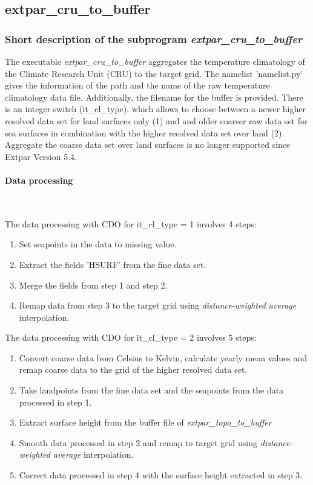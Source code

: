 \documentclass[a4paper,10pt,DIV14,BCOR1cm,titlepage,twoside]{scrartcl}
\begin{document}
\subsection{extpar\_cru\_to\_buffer}\label{extpar_cru_to_buffer}
\subsubsection{Short description of the subprogram \textit{extpar\_cru\_to\_buffer}}
The executable \textit{extpar\_cru\_to\_buffer} aggregates the temperature climatology of the Climate Research Unit (CRU) to the target grid. 
The namelist 'namelist.py' gives the information of the path and the name of the raw temperature climatology data file. Additionally, the filename for the buffer is provided. There is an integer switch (it\_cl\_type), which allows to choose between a newer higher resolved data set for land surfaces only (1) and and older coarser raw data set for sea surfaces in combination with the  higher resolved data set over land (2). Aggregate the coarse data set over land surfaces is no longer supported since Extpar Version 5.4. \par\medskip\noindent

\paragraph{Data processing} \ \par\medskip\noindent

\noindent The data processing with CDO for it\_cl\_type = 1 involves 4 steps:
\begin{enumerate}
  \item Set seapoints in the data to missing value.
  \item Extract the fields 'HSURF' from the fine data set.
  \item Merge the fields from step 1 and step 2.
  \item Remap data from step 3 to the target grid using \textit{distance-weighted average} interpolation. 
\end{enumerate}

\noindent The data processing with CDO for it\_cl\_type = 2 involves 5 steps:
\begin{enumerate}
  \item Convert coarse data from Celsius to Kelvin, calculate yearly mean values and remap coarse data to the grid of the higher resolved data set.
  \item Take landpoints from the fine data set and the seapoints from the data processed in step 1.
  \item Extract surface height from the buffer file of \textit{extpar\_topo\_to\_buffer}
  \item Smooth data processed in step 2 and remap to target grid using \textit{distance-weighted average} interpolation. 
  \item Correct data processed in step 4 with the surface height extracted in step 3.
\end{enumerate}
\end{document}
